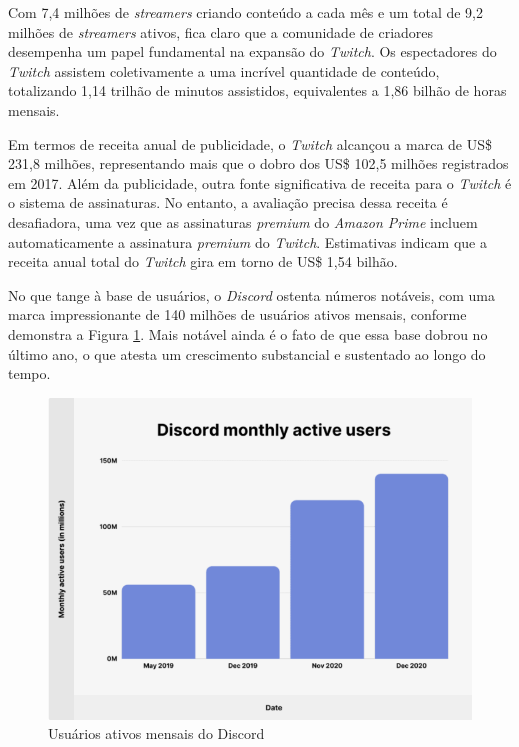 Com 7,4 milhões de \textit{streamers} criando conteúdo a cada mês e um total de 9,2 milhões de \textit{streamers} ativos, fica claro que a comunidade de criadores desempenha um papel fundamental na expansão do \textit{\gls{Twitch}}. Os espectadores do \textit{\gls{Twitch}} assistem coletivamente a uma incrível quantidade de conteúdo, totalizando 1,14 trilhão de minutos assistidos, equivalentes a 1,86 bilhão de horas mensais.

Em termos de receita anual de publicidade, o \textit{\gls{Twitch}} alcançou a marca de US\$ 231,8 milhões, representando mais que o dobro dos US\$ 102,5 milhões registrados em 2017. Além da publicidade, outra fonte significativa de receita para o \textit{\gls{Twitch}} é o sistema de assinaturas. No entanto, a avaliação precisa dessa receita é desafiadora, uma vez que as assinaturas \textit{premium} do \textit{\gls{Amazon Prime}} incluem automaticamente a assinatura \textit{premium} do \textit{\gls{Twitch}}. Estimativas indicam que a receita anual total do \textit{\gls{Twitch}} gira em torno de US\$ 1,54 bilhão.

No que tange à base de usuários, o \textit{\gls{Discord}} ostenta números notáveis, com uma marca impressionante de 140 milhões de usuários ativos mensais, conforme demonstra a Figura \ref{usuariosMensaisDiscord}. Mais notável ainda é o fato de que essa base dobrou no último ano, o que atesta um crescimento substancial e sustentado ao longo do tempo. 

\begin{figure}[H]
    \center
	\caption{\label{fig_sge20}Usuários ativos mensais do Discord}
    \label{usuariosMensaisDiscord}
    \includegraphics[scale=0.7]{imagens/viabilidadeFinanceira/DiscordActiveUsers.png}
\end{figure}

